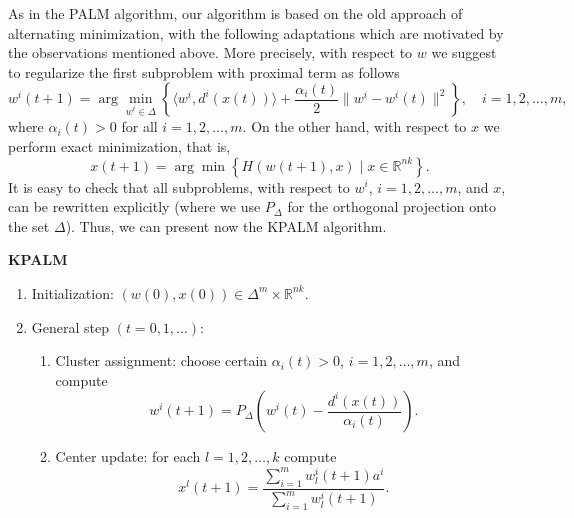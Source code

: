 \documentclass[12pt]{article}
\numberwithin{equation}{section}
\begin{document}
As in the PALM algorithm, our algorithm is based on the old approach of alternating minimization, with the following adaptations which are motivated by the observations mentioned above. More precisely, with respect to $w$ we suggest to regularize the first subproblem with proximal term as follows
\begin{equation}
	w^i(t+1) = \arg\!\min\limits_{w^i \in \Delta} \left\lbrace \langle w^i , d^i(x(t)) \rangle + \frac{\alpha_i(t)}{2} \|w^i - w^i(t)\|^2 \right\rbrace, \quad i=1,2, \ldots, m , \label{State_w_update}
\end{equation}
where $\alpha_i(t) > 0$ for all $i=1,2, \ldots, m$. On the other hand, with respect to $x$ we perform exact minimization, that is,
\begin{equation}
	x(t+1) = \arg\!\min \left\lbrace H(w(t+1), x) \mid x \in \mathbb{R}^{nk} \right\rbrace . \label{State_x_update}
\end{equation}
It is easy to check that all subproblems, with respect to $w^i$, $i=1,2, \ldots, m$, and $x$, can be rewritten explicitly (where we use $P_{\Delta}$ for the orthogonal projection onto the set $\Delta$). Thus, we can present now the KPALM algorithm.
\begin{framed}
\noindent \textbf{KPALM}
\begin{enumerate}[(1)]
	\item Initialization: $(w(0),x(0)) \in \Delta^m \times \mathbb{R}^{nk} .$
	\item General step $\left( t=0,1, \ldots \right)$:
	\begin{enumerate}[(2.1)]
		\item Cluster assignment: choose certain $\alpha_i(t) > 0$, $i=1,2, \ldots, m$, and compute
		\begin{equation}
			w^i(t+1) = P_{\Delta} \left(w^i(t) - \frac{d^i(x(t))}{\alpha_i(t)}\right) . \label{StateEq5}
		\end{equation}
		\item Center update: for each $l=1, 2, \ldots ,k$ compute
		\begin{equation}
			x^l(t+1) = \frac{\sum_{i=1}^{m} w^i_l(t+1) a^i}{\sum_{i=1}^{m} w^i_l(t+1)} . \label{StateEq6}
		\end{equation}
	\end{enumerate}
\end{enumerate}
\end{framed}
\end{document}
